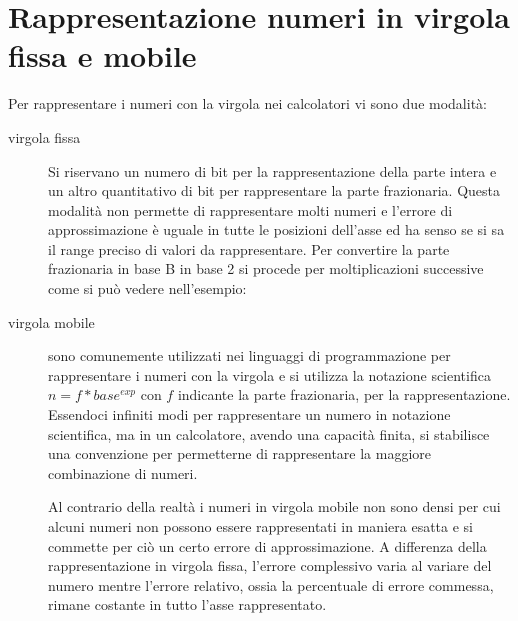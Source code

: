 \section{Rappresentazione numeri in virgola fissa e mobile}
Per rappresentare i numeri con la virgola nei calcolatori vi sono due modalità:
\begin{description}
  \item[virgola fissa] Si riservano un numero di bit per la rappresentazione della
        parte intera e un altro quantitativo di bit per rappresentare la parte frazionaria.\newline
        Questa modalità non permette di rappresentare molti numeri e l'errore di approssimazione
        è uguale in tutte le posizioni dell'asse ed ha senso se si sa il range
        preciso di valori da rappresentare.\newline
        Per convertire la parte frazionaria in base B in base 2 si procede per
        moltiplicazioni successive come si può vedere nell'esempio:

  \item[virgola mobile] sono comunemente utilizzati nei linguaggi di programmazione
        per rappresentare i numeri con la virgola e si utilizza la notazione scientifica
        $n = f * base^{exp}$ con $f$ indicante la parte frazionaria, per la rappresentazione.\newline
        Essendoci infiniti modi per rappresentare un numero in notazione scientifica,
        ma in un calcolatore, avendo una capacità finita, si stabilisce una convenzione
        per permetterne di rappresentare la maggiore combinazione di numeri.


        Al contrario della realtà i numeri in virgola mobile non sono densi per cui
        alcuni numeri non possono essere rappresentati in maniera esatta e si commette
        per ciò un certo errore di approssimazione.\newline
        A differenza della rappresentazione in virgola fissa, l'errore complessivo varia
        al variare del numero mentre l'errore relativo, ossia la percentuale di errore commessa,
        rimane costante in tutto l'asse rappresentato.

\end{description}

